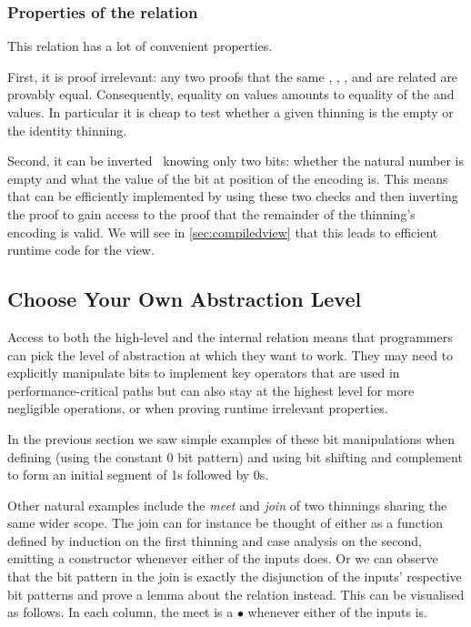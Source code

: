 \subsubsection{Properties of the  relation}

This relation has a lot of convenient properties.

First, it is proof irrelevant: any two proofs that the same
, , , and  are
related are provably equal.
%
Consequently, equality on  values amounts to equality of
the  and  values. In particular
it is cheap to test whether a given thinning is the empty or the
identity thinning.

Second, it can be inverted~\cite{DBLP:conf/types/CornesT95} knowing only two bits:
whether the natural number is empty and what the value of the bit at position
 of the encoding is.
%
This means that  can be efficiently implemented by using
these two checks and then inverting the  proof to gain access
to the proof that the remainder of the thinning's encoding is valid.
%
We will see in \cref{sec:compiledview} that this leads to efficient runtime code for the view.

\subsection{Choose Your Own Abstraction Level}

Access to both the high-level  and the internal 
relation means that programmers can pick the level of abstraction at which they
want to work.
%
They may need to explicitly manipulate bits to implement key operators that are
used in performance-critical paths but can also stay at the highest level for
more negligible operations, or when proving runtime irrelevant properties.

In the previous section we saw simple examples of these bit manipulations when
defining  (using the constant 0 bit pattern) and
 using bit shifting and complement to form an initial segment
of 1s followed by 0s.

Other natural examples include the \emph{meet} and \emph{join} of two thinnings
sharing the same wider scope.
%
The join can for instance be thought of either as a function defined by induction
on the first thinning and case analysis on the second, emitting a 
constructor whenever either of the inputs does.
%
Or we can observe that the bit pattern in the join is exactly the disjunction of
the inputs' respective bit patterns and prove a lemma about the 
relation instead.
%
This can be visualised as follows. In each column, the meet is a
$\bullet$ whenever either of the inputs is.

